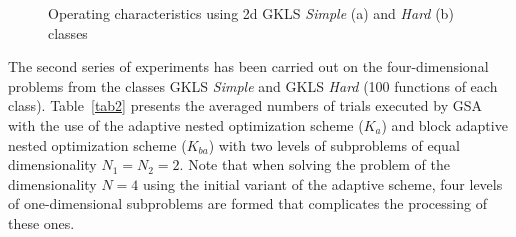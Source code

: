 \documentclass[runningheads]{llncs}
\begin{document}
\begin{figure}
\begin{minipage}{0.5\linewidth}
\end{minipage}
\begin{minipage}{0.5\linewidth}
\end{minipage}
\caption{Operating characteristics using 2d GKLS \textit{Simple} (a) and \textit{Hard} (b) classes}
\label{fig2}
\end{figure}

The second series of experiments has been carried out on the four-dimensional problems from the classes GKLS 
\textit{Simple} and GKLS \textit{Hard} (100 functions of each class). Table~\ref{tab2}  presents the averaged numbers 
of trials executed by GSA with the use of the adaptive nested optimization scheme ($K_a$) and block adaptive nested 
optimization scheme ($K_{ba}$) with two levels of subproblems of equal dimensionality $N_1=N_2=2$. 
Note that when solving the problem of the dimensionality $N=4$ using the initial variant of the adaptive scheme, four 
levels of one-dimensional subproblems are formed that complicates the processing of these ones.
\end{document}
